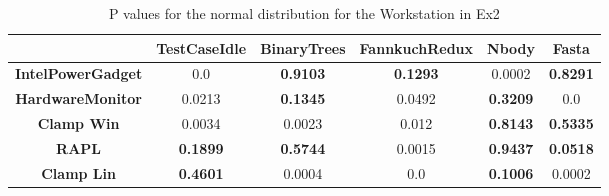 \begin{table}[]
    \begin{tabular}{||c|c|c|c|c|c||}    \hline
    &\textbf{TestCaseIdle}&\textbf{BinaryTrees}&\textbf{FannkuchRedux}&\textbf{Nbody}&\textbf{Fasta}\\ [0.5ex] \hline
    \hline \textbf{IntelPowerGadget}&0.0&\textbf{0.9103}&\textbf{0.1293}&0.0002&\textbf{0.8291}\\
    \textbf{HardwareMonitor}&0.0213&\textbf{0.1345}&0.0492&\textbf{0.3209}&0.0\\
    \textbf{Clamp Win}&0.0034&0.0023&0.012&\textbf{0.8143}&\textbf{0.5335}\\
    \textbf{RAPL}&\textbf{0.1899}&\textbf{0.5744}&0.0015&\textbf{0.9437}&\textbf{0.0518}\\
    \textbf{Clamp Lin}&\textbf{0.4601}&0.0004&0.0&\textbf{0.1006}&0.0002\\ \hline \end{tabular}
    \caption{P values for the normal distribution for the Workstation in Ex2}
    \label{tab:NormDist2}
\end{table}